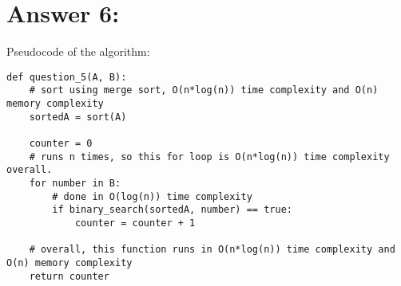 \documentclass{article}
\begin{document}
\section{Answer 6:}
Pseudocode of the algorithm:
\begin{verbatim}
def question_5(A, B):
    # sort using merge sort, O(n*log(n)) time complexity and O(n) memory complexity
    sortedA = sort(A) 
    
    counter = 0
    # runs n times, so this for loop is O(n*log(n)) time complexity overall.
    for number in B: 
        # done in O(log(n)) time complexity
        if binary_search(sortedA, number) == true: 
            counter = counter + 1

    # overall, this function runs in O(n*log(n)) time complexity and O(n) memory complexity
    return counter 
        
\end{verbatim}
\end{document}
